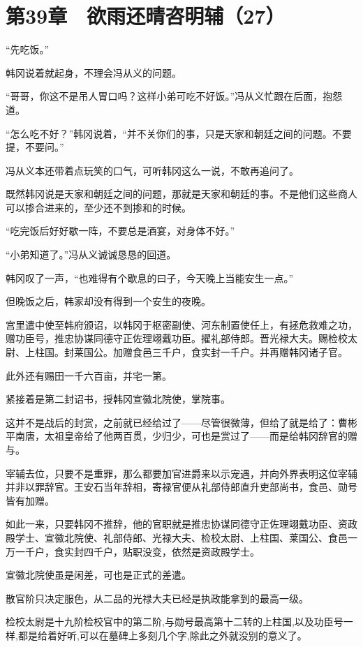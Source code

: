 \section{第39章　欲雨还晴咨明辅（27）}

“先吃饭。”

韩冈说着就起身，不理会冯从义的问题。

“哥哥，你这不是吊人胃口吗？这样小弟可吃不好饭。”冯从义忙跟在后面，抱怨道。

“怎么吃不好？”韩冈说着，“并不关你们的事，只是天家和朝廷之间的问题。不要提，不要问。”

冯从义本还带着点玩笑的口气，可听韩冈这么一说，不敢再追问了。

既然韩冈说是天家和朝廷之间的问题，那就是天家和朝廷的事。不是他们这些商人可以掺合进来的，至少还不到掺和的时候。

“吃完饭后好好歇一阵，不要总是酒宴，对身体不好。”

“小弟知道了。”冯从义诚诚恳恳的回道。

韩冈叹了一声，“也难得有个歇息的曰子，今天晚上当能安生一点。”

但晚饭之后，韩家却没有得到一个安生的夜晚。

宫里遣中使至韩府颁诏，以韩冈于枢密副使、河东制置使任上，有拯危救难之功，赠功臣号，推忠协谋同德守正佐理翊戴功臣。擢礼部侍郎。晋光禄大夫。赐检校太尉、上柱国。封莱国公。加赠食邑三千户，食实封一千户。并再赠韩冈诸子官。

此外还有赐田一千六百亩，并宅一第。

紧接着是第二封诏书，授韩冈宣徽北院使，掌院事。

这并不是战后的封赏，之前就已经给过了——尽管很微薄，但给了就是给了：曹彬平南唐，太祖皇帝给了他两百贯，少归少，可也是赏过了——而是给韩冈辞官的赠与。

宰辅去位，只要不是重罪，那么都要加官进爵来以示宠遇，并向外界表明这位宰辅并非以罪辞官。王安石当年辞相，寄禄官便从礼部侍郎直升吏部尚书，食邑、勋号皆有加赠。

如此一来，只要韩冈不推辞，他的官职就是推忠协谋同德守正佐理翊戴功臣、资政殿学士、宣徽北院使、礼部侍郎、光禄大夫、检校太尉、上柱国、莱国公、食邑一万一千户，食实封四千户，贴职没变，依然是资政殿学士。

宣徽北院使虽是闲差，可也是正式的差遣。

散官阶只决定服色，从二品的光禄大夫已经是执政能拿到的最高一级。

检校太尉是十九阶检校官中的第二阶,与勋号最高第十二转的上柱国,以及功臣号一样,都是给着好听,可以在墓碑上多刻几个字,除此之外就没别的意义了。

